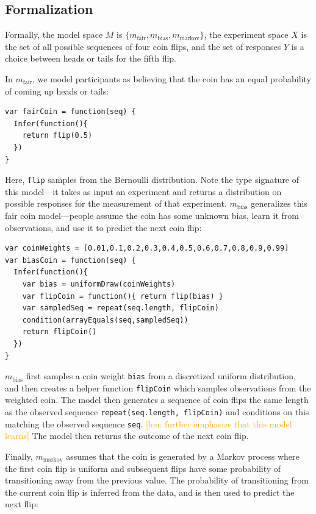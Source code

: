 \documentclass{article}
\newcommand{\lou}[1]{\textcolor{orange}{[lou: #1]}}
\begin{document}
\subsection{Formalization}

Formally, the model space $M$ is $\{m_{\text{fair}}, m_{\text{bias}}, m_{\text{markov}}\}$, the experiment space $X$ is the set of all possible sequences of four coin flips, and the set of responses $Y$ is a choice between heads or tails for the fifth flip.

In $m_{\text{fair}}$, we model participants as believing that the coin has an equal probability of coming up heads or tails:

\begin{lstlisting}[caption=Fair coin model,  label={lst:m_fair},upquote=true]
var fairCoin = function(seq) {
  Infer(function(){
    return flip(0.5)
  })
}
\end{lstlisting}
Here, \lstinline{flip} samples from the Bernoulli distribution.
Note the type signature of this model---it takes as input an experiment and returns a distribution on possible responses for the measurement of that experiment.
$m_{\text{bias}}$ generalizes this fair coin model---people assume the coin has some unknown bias, learn it from observations, and use it to predict the next coin flip:

\begin{lstlisting}[caption=Biased coin model,  label={lst:m_weighted}, upquote=true]
var coinWeights = [0.01,0.1,0.2,0.3,0.4,0.5,0.6,0.7,0.8,0.9,0.99]
var biasCoin = function(seq) {
  Infer(function(){
    var bias = uniformDraw(coinWeights)
    var flipCoin = function(){ return flip(bias) }
    var sampledSeq = repeat(seq.length, flipCoin)
    condition(arrayEquals(seq,sampledSeq))
    return flipCoin()
  })
}
\end{lstlisting}

$m_{\text{bias}}$ first samples a coin weight \lstinline{bias} from a discretized uniform distribution, and
then creates a helper function \lstinline{flipCoin} which samples observations from the weighted coin.
The model then generates a sequence of coin flips the same length as the observed sequence \lstinline{repeat(seq.length, flipCoin)} and conditions on this matching the observed sequence \lstinline{seq}.
\lou{further emphasize that this model learns}
The model then returns the outcome of the next coin flip.

Finally, $m_{\text{markov}}$ assumes that the coin is generated by a Markov process where the first coin flip is uniform and subsequent flips have some probability of transitioning away from the previous value.
The probability of transitioning from the current coin flip is inferred from the data, and is then used to predict the next flip:
\end{document}
